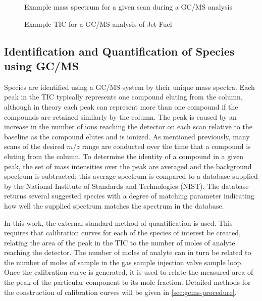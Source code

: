 \documentclass[../main.tex]{subfiles}
\begin{document}
\begin{figure}
    \begin{floatrow}
            {\caption{Example mass spectrum for a given scan during a GC/MS analysis}
            \label{fig:gcms-mass-spec}}
            {\caption{Example TIC for a GC/MS analysis of Jet Fuel}
            \label{fig:gcms-tic}}
    \end{floatrow}
\end{figure}

\subsection{Identification and Quantification of Species using GC/MS}

Species are identified using a GC/MS system by their unique mass spectra.
Each peak in the TIC typically represents one compound eluting from the
column, although in theory each peak can represent more than one compound
if the compounds are retained similarly by the column. The peak is caused
by an increase in the number of ions reaching the detector on each scan
relative to the baseline as the compound elutes and is ionized. As
mentioned previously, many scans of the desired $m/z$ range are
conducted over the time that a compound is eluting from the column.
To determine the identity of a compound in a given peak, the set of
mass intensities over the peak are averaged and the background
spectrum is subtracted; this average spectrum is compared to a
database supplied by the National Institute of Standards and
Technologies (NIST). The database returns several suggested species
with a degree of matching parameter indicating how well the supplied
spectrum matches the spectrum in the database.

In this work, the external standard method of quantification is used.
This requires that calibration curves for each of the species of
interest be created, relating the area of the peak in the TIC to
the number of moles of analyte reaching the detector. The number of
moles of analyte can in turn be related to the number of moles of
sample in the gas sample injection valve sample loop. Once the
calibration curve is generated, it is used to relate the measured
area of the peak of the particular component to its mole fraction. Detailed
methods for the construction of calibration curves will be given in
\cref{sec:gcms-procedure}.
\end{document}

